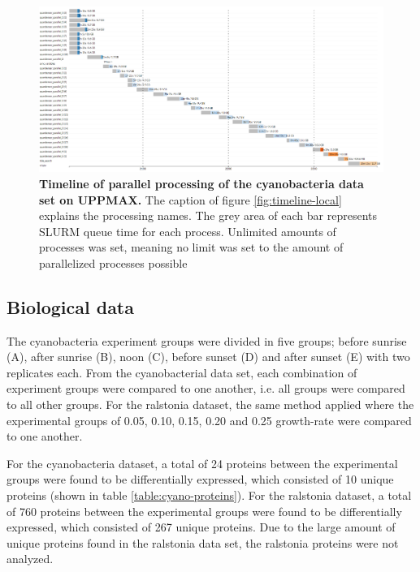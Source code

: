 \begin{figure}[H]
  \includegraphics[width=\linewidth]{results/timeline-cluster.png}
  \caption{\textbf{Timeline of parallel processing of the cyanobacteria data set on UPPMAX.} The caption of figure \ref{fig:timeline-local} explains the processing names. The grey area of each bar represents SLURM queue time for each process. Unlimited amounts of processes was set, meaning no limit was set to the amount of parallelized processes possible}
  \label{fig:timeline-cluster}
\end{figure}

\subsection{Biological data}
The cyanobacteria experiment groups were divided in five groups; before sunrise (A), after sunrise (B), noon (C), before sunset (D) and after sunset (E) with two replicates each. From the cyanobacterial data set, each combination of experiment groups were compared to one another, i.e. all groups were compared to all other groups. For the ralstonia dataset, the same method applied where the experimental groups of 0.05, 0.10, 0.15, 0.20 and 0.25 growth-rate were compared to one another.

For the cyanobacteria dataset, a total of 24 proteins between the experimental groups were found to be differentially expressed, which consisted of 10 unique proteins (shown in table \ref{table:cyano-proteins}). For the ralstonia dataset, a total of 760 proteins between the experimental groups were found to be differentially expressed, which consisted of 267 unique proteins. Due to the large amount of unique proteins found in the ralstonia data set, the ralstonia proteins were not analyzed.

